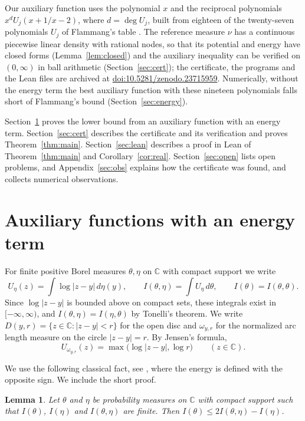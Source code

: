 \documentclass[11pt]{amsart}
\newtheorem{lemma}[theorem]{Lemma}
\theoremstyle{remark}
\numberwithin{equation}{section}
\newcommand{\C}{\mathbb{C}}
\newcommand{\SuppDOI}{10.5281/zenodo.23715959}
\begin{document}
Our auxiliary function uses the polynomial $x$ and the reciprocal polynomials $x^dU_j(x+1/x-2)$, where $d=\deg U_j$, built from eighteen of the twenty-seven polynomials $U_j$ of Flammang's table \cite[Table~1]{Fla15}. The reference measure $\nu$ has a continuous piecewise linear density with rational nodes, so that its potential and energy have closed forms (Lemma~\ref{lem:closed}) and the auxiliary inequality can be verified on $(0,\infty)$ in ball arithmetic \cite{Joh17} (Section~\ref{sec:cert}); the certificate, the programs and the Lean files are archived at \href{https://doi.org/\SuppDOI}{doi:\SuppDOI}. Numerically, without the energy term the best auxiliary function with these nineteen polynomials falls short of Flammang's bound (Section~\ref{sec:energy}).

Section~\ref{sec:aux} proves the lower bound from an auxiliary function with an energy term. Section~\ref{sec:cert} describes the certificate and its verification and proves Theorem~\ref{thm:main}. Section~\ref{sec:lean} describes a proof in Lean of Theorem~\ref{thm:main} and Corollary~\ref{cor:real}. Section~\ref{sec:open} lists open problems, and Appendix~\ref{sec:obs} explains how the certificate was found, and collects numerical observations.

\section{Auxiliary functions with an energy term}\label{sec:aux}

For finite positive Borel measures $\theta,\eta$ on $\C$ with compact support we write
\[
U_\eta(z)=\int\log|z-y|\,d\eta(y),\qquad I(\theta,\eta)=\int U_\eta\,d\theta,\qquad I(\theta)=I(\theta,\theta).
\]
Since $\log|z-y|$ is bounded above on compact sets, these integrals exist in $[-\infty,\infty)$, and $I(\theta,\eta)=I(\eta,\theta)$ by Tonelli's theorem. We write $D(y,r)=\{z\in\C:|z-y|<r\}$ for the open disc and $\omega_{y,r}$ for the normalized arc length measure on the circle $|z-y|=r$. By Jensen's formula,
\begin{equation}\label{eq:circle}
U_{\omega_{y,r}}(z)=\max\bigl(\log|z-y|,\log r\bigr)\qquad(z\in\C).
\end{equation}

We use the following classical fact, see \cite[Lemma~I.1.8]{ST97}, where the energy is defined with the opposite sign. We include the short proof.

\begin{lemma}\label{lem:neg}
Let $\theta$ and $\eta$ be probability measures on $\C$ with compact support such that $I(\theta)$, $I(\eta)$ and $I(\theta,\eta)$ are finite. Then $I(\theta)\le2I(\theta,\eta)-I(\eta)$.
\end{lemma}
\end{document}
